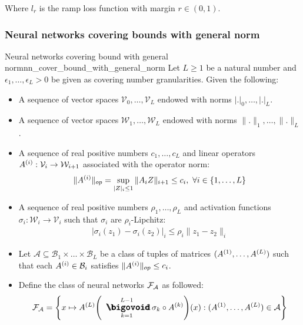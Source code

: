 \noindent Where $l_r$ is the ramp loss function with margin $r\in(0,1)$.

\subsubsection{Neural networks covering bounds with general norm}
\begin{theorem}{Neural networks covering bound with general norm}{nn_cover_bound_with_general_norm}
    Let $L \ge 1$ be a natural number and $\epsilon_1, \dots, \epsilon_L > 0$ be given as covering number granularities. Given the following:
    \begin{itemize}
        \item A sequence of vector spaces $\mathcal{V}_0, \dots, \mathcal{V}_L$ endowed with norms $|.|_0, \dots, |.|_L$.
        \item A sequence of vector spaces $\mathcal{W}_1, \dots, \mathcal{W}_L$ endowed with norms $\|.\|_1, \dots, \|.\|_L$.
        \item A sequence of real positive numbers $c_1, \dots, c_L$ and linear operators $A^{(i)} : \mathcal{V}_i \to \mathcal{W}_{i+1}$ associated with the operator norm:
        \begin{align*}
            \|A^{(i)}\|_{op} = \sup_{|Z|_i \le 1} \|A_iZ\|_{i+1} \le c_i, \ \forall i \in \{1, \dots, L\}
        \end{align*}

        \item A sequence of real positive numbers $\rho_1, \dots, \rho_L$ and activation functions $\sigma_i:\mathcal{W}_i \to \mathcal{V}_i$ such that $\sigma_i$ are $\rho_i$-Lipchitz:
        \begin{align*}
            |\sigma_i(z_1) - \sigma_i(z_2)|_i \le \rho_i\|z_1 - z_2\|_i
        \end{align*}

        \item Let $\mathcal{A}\subseteq \mathcal{B}_1\times\dots\times\mathcal{B}_L$ be a class of tuples of matrices $(A^{(1)}, \dots, A^{(L)})$ such that each $A^{(i)} \in \mathcal{B}_i$ satisfies $\|A^{(i)}\|_{op} \le c_i$.

        \item Define the class of neural networks $\mathcal{F}_\mathcal{A}$ as followed:
        \begin{align*}
            \F_\mathcal{A} = \biggCurl{
                x\mapsto \A{L}\biggRound{
                    \bigO_{k=1}^{L-1}\sigma_k \circ \A{k}
                }(x) : (\A{1}, \dots, \A{L}) \in \mathcal{A}
            }
        \end{align*}
        

\end{itemize}
\end{theorem}
